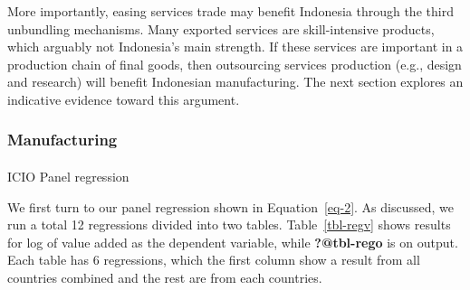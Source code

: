 \documentclass[
  letterpaper,
  DIV=11,
  numbers=noendperiod]{scrartcl}
\makeatletter
\let\oldparagraph\paragraph
\renewcommand{\paragraph}{
    \@ifstar
      \xxxParagraphStar
      \xxxParagraphNoStar
  }
\newcommand{\xxxParagraphStar}[1]{\oldparagraph*{#1}\mbox{}}
\newcommand{\xxxParagraphNoStar}[1]{\oldparagraph{#1}\mbox{}}
\makeatother
\begin{document}
More importantly, easing services trade may benefit Indonesia through
the third unbundling mechanisms. Many exported services are
skill-intensive products, which arguably not Indonesia's main strength.
If these services are important in a production chain of final goods,
then outsourcing services production (e.g., design and research) will
benefit Indonesian manufacturing. The next section explores an
indicative evidence toward this argument.

\subsubsection{Manufacturing}\label{manufacturing}

\paragraph{ICIO Panel regression}\label{icio-panel-regression}

We first turn to our panel regression shown in Equation~\ref{eq-2}. As
discussed, we run a total 12 regressions divided into two tables.
Table~\ref{tbl-regv} shows results for log of value added as the
dependent variable, while \textbf{?@tbl-rego} is on output. Each table
has 6 regressions, which the first column show a result from all
countries combined and the rest are from each countries.
\end{document}
